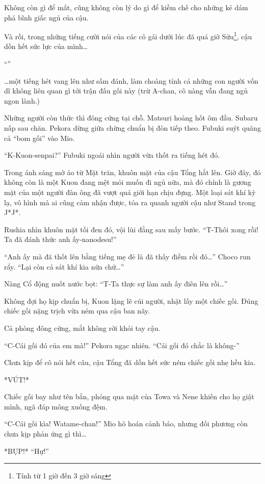 \documentclass[../main.tex]{subfiles}
\begin{document}
Không còn gì để mất, cũng không còn lý do gì để kiềm chế cho những kẻ dám phá bĩnh giấc ngủ của cậu.

Và rồi, trong những tiếng cười nói của các cô gái dưới lúc đã quá giờ Sửu\footnote{Tính từ 1 giờ đến 3 giờ sáng}, cậu dồn hết sức lực của mình\dots

``''

\dots một tiếng hét vang lên như sấm đánh, làm choàng tỉnh cả những con người vốn dĩ không liên quan gì tới trận đấu gối này (trừ A-chan, cô nàng vẫn đang ngủ ngon lành.)

Những người còn thức thì đông cứng tại chỗ. Matsuri hoảng hốt ôm đầu. Subaru nấp sau chăn. Pekora dừng giữa chừng chuẩn bị đòn tiếp theo. Fubuki suýt quăng cả ``bom gối'' vào Mio.

``K-Kuon-senpai?'' Fubuki ngoái nhìn người vừa thốt ra tiếng hét đó.

Trong ánh sáng mờ ảo từ Mặt trăn, khuôn mặt của cậu Tổng hắt lên. Giờ đây, đó không còn là một Kuon đang mệt mỏi muốn đi ngủ nữa, mà đó chính là gương mặt của một người đàn ông đã vượt quá giới hạn chịu đựng. Một loại sát khí kỳ lạ, vô hình mà ai cũng cảm nhận được, tỏa ra quanh người cậu như Stand trong J*J*.

Rushia nhìn khuôn mặt tối đen đó, vội lùi đằng sau mấy bước. ``T-Thôi xong rồi! Ta đã đánh thức anh ấy-nanodesu!''

``Anh ấy mà đã thốt lên bằng tiếng mẹ đẻ là đã thấy điềm rồi đó\dots'' Choco run rẩy. ``Lại còn cả sát khí kia nữa chứ\dots''

Nàng Cổ động nuốt nước bọt: ``T-Ta thực sự làm anh ấy điên lên rồi\dots''

Không đợi họ kịp chuẩn bị, Kuon lặng lẽ cúi người, nhặt lấy một chiếc gối. Đúng chiếc gối nặng trịch vừa ném qua cậu ban nãy.

Cả phòng đông cứng, mắt không rời khỏi tay cậu.

``C-Cái gối đó của em mà!'' Pekora ngạc nhiên. ``Cái gối đó chắc là không-''

Chưa kịp để cô nói hết câu, cậu Tổng đã dồn hết sức ném chiếc gối nhẹ hều kia.

*VÚT!*

Chiếc gối bay như tên bắn, phóng qua mặt của Towa và Nene khiến cho họ giật mình, ngã đáp mông xuống đệm.

``C-Cái gối kìa! Watame-chan!'' Mio hô hoán cảnh báo, nhưng đối phương còn chưa kịp phản ứng gì thì\dots

*BỤP!* ``Hự!''
\end{document}

